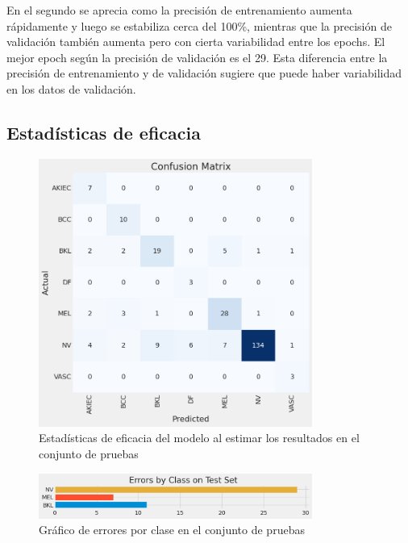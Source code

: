 En el segundo se aprecia como la precisión de entrenamiento aumenta rápidamente y luego se estabiliza cerca del 100\%, mientras que la precisión de validación también aumenta pero con cierta variabilidad entre los epochs. El mejor epoch según la precisión de validación es el 29. Esta diferencia entre la precisión de entrenamiento y de validación sugiere que puede haber variabilidad en los datos de validación.

\subsection*{Estadísticas de eficacia}\label{sub:accuracy_statistic_p1}
\begin{figure}[ht]%
   \begin{center}
   \includegraphics[width=0.8\textwidth]{./Graphics/confussionmatrix_p1.png}
   \caption{Estadísticas de eficacia del modelo al estimar los resultados en el conjunto de pruebas\label{fig:confussion_matrix_p1}}
   \end{center}
   \end{figure}

   \begin{figure}[ht]%
      \begin{center}
      \includegraphics[width=0.8\textwidth]{./Graphics/errorByClass_p1.png}
      \caption{Gráfico de errores por clase en el conjunto de pruebas\label{fig:class_errors_p1}}
      \end{center}
      \end{figure} 


